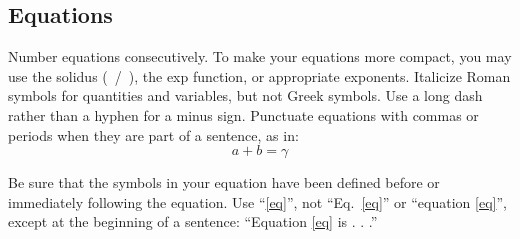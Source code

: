 \documentclass[conference,onecolumn,11pt]{IEEEtran}
\begin{document}
\subsection{Equations}
Number equations consecutively. To make your 
equations more compact, you may use the solidus (~/~), the exp function, or 
appropriate exponents. Italicize Roman symbols for quantities and variables, 
but not Greek symbols. Use a long dash rather than a hyphen for a minus 
sign. Punctuate equations with commas or periods when they are part of a 
sentence, as in:
\begin{equation}
a+b=\gamma\label{eq}
\end{equation}

Be sure that the 
symbols in your equation have been defined before or immediately following 
the equation. Use ``\eqref{eq}'', not ``Eq.~\eqref{eq}'' or ``equation \eqref{eq}'', except at 
the beginning of a sentence: ``Equation \eqref{eq} is . . .''

\printbibliography

\vspace{12pt}
\end{document}
